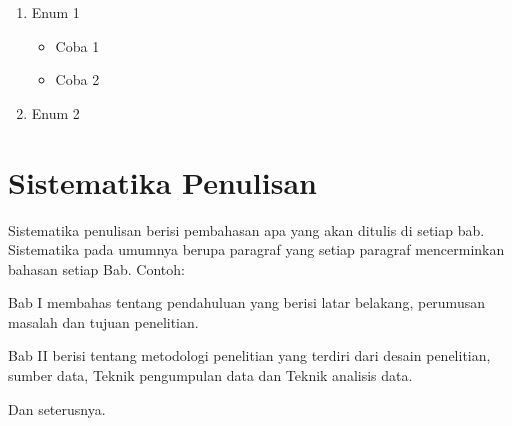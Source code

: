 \begin{enumerate}
	\item Enum 1
	\begin{itemize}
		\item Coba 1
		\item Coba 2
	\end{itemize}
	\item Enum 2
\end{enumerate}



\section{Sistematika Penulisan}

Sistematika penulisan berisi pembahasan apa yang akan ditulis di setiap bab. 
Sistematika pada umumnya berupa paragraf yang setiap paragraf mencerminkan 
bahasan setiap Bab. Contoh:

\noindent Bab I membahas tentang pendahuluan yang berisi latar belakang, perumusan masalah 
dan tujuan penelitian. 

\noindent Bab II berisi tentang metodologi penelitian yang terdiri dari desain penelitian, sumber data, Teknik pengumpulan data dan Teknik analisis data.

\noindent Dan seterusnya.

